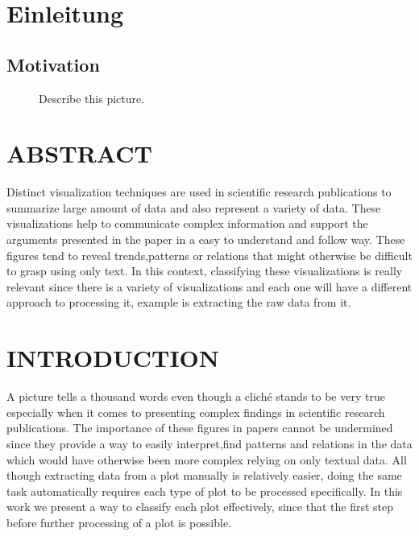 \documentclass[12pt, a4paper,oneside]{report}
\begin{document}


\setcounter{tocdepth}{10}
\tableofcontents





\listoffigures
\listoftables

\titleformat{\chapter}{\LARGE\bfseries}{\thechapter}{1em}{}

\newpage
\chapter{Einleitung}

\section{Motivation}

\begin{figure}[!ht]
	\centering
	\caption{Describe this picture.}
	\label{fig:1}
\end{figure}

\chapter{ABSTRACT}
Distinct visualization techniques are used in scientific research publications to summarize large amount of data and also represent a variety of data. These visualizations help to communicate complex information and support the arguments presented in the paper in a easy to understand and follow way.
These figures tend to reveal trends,patterns or relations that might otherwise be difficult to grasp using only text. In this context, classifying these visualizations is really relevant since there is a variety of visualizations and each one will have a different approach to processing it, example is extracting the raw data from it. 

\chapter{INTRODUCTION}
A picture tells a thousand words even though a cliché stands to be very true especially when it comes to presenting complex findings in scientific research publications. The importance of these figures in papers cannot be undermined since they provide a way to easily interpret,find patterns and relations in the data which would have otherwise been more complex relying on  only textual data. All though extracting data from a plot manually is relatively easier, doing the same task automatically requires each type of plot to be processed specifically. In this work we present a way to classify each plot effectively, since that the first step before further processing of a plot is possible.  
\end{document}
